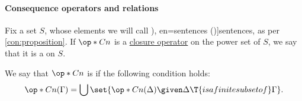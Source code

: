 \paragraph{Consequence operators and relations}

\begin{definition}\label{def:consequence_operator}\mimprovised
  Fix a set \( S \), whose elements we will call \term[ru=предложения (\cite[103]{КолмогоровДрагалин2006ЛогикаВведение}), en=sentences (\cite[62]{Tarski1983Collection:MethodologyOfDeductiveSciences})]{sentences}, as per \cref{con:proposition}. If \( \op*{Cn} \) is a \hyperref[def:abstract_closure_operator]{closure operator} on the power set of \( S \), we say that it is a  on \( S \).

  \begin{thmenum}
     We say that \( \op*{Cn} \) is  if the following condition holds:
    \begin{equation}\label{eq:def:consequence_operator/compactness}
      \op*{Cn}(\Gamma) = \bigcup\set{ \op*{Cn}(\Delta) \given \Delta \T{is a finite subset of} \Gamma }.
    \end{equation}
  \end{thmenum}
\end{definition}

